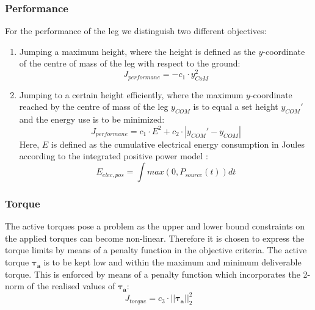 \documentclass[letterpaper, 10 pt, conference]{ieeeconf}  %
\begin{document}
\subsubsection{Performance}
For the performance of the leg we distinguish two different objectives: 
\begin{enumerate}
	\item Jumping a maximum height, where the height is defined as the $y$-coordinate of the centre of mass of the leg with respect to the ground:
 \begin{equation}
	J_{performane} = -c_1 \cdot y_{CoM}^2
 \end{equation}
	\item Jumping to a certain height efficiently, where the maximum $y$-coordinate reached by the centre of mass of the leg $y_{COM}$ is to equal a set height $y_{COM}'$ and the energy use is to be minimized:
 \begin{equation}
	J_{performane} =  c_1 \cdot E^2 + c_2 \cdot |y_{COM}'-y_{COM}|
 \end{equation}
	Here, $E$ is defined as the cumulative electrical energy consumption in Joules according to the integrated positive power model \cite{verstraten2016energy}:
	 \begin{equation}
	E_{elec,pos} = \int max(0,P_{source}(t))dt
	\end{equation}
\end{enumerate}

\subsubsection{Torque}
The active torques pose a problem as the upper and lower bound constraints on the applied torques can become non-linear. Therefore it is chosen to express the torque limits by means of a penalty function in the objective criteria.
The active torque $\boldsymbol{\tau_a}$ is to be kept low and within the maximum and minimum deliverable torque. This is enforced by means of a penalty function which incorporates the 2-norm of the realised values of $\boldsymbol{\tau_a}$:  
 \begin{equation}
J_{torque}= c_3 \cdot || \boldsymbol{\tau_a} ||_2^2
 \end{equation}
\end{document}
